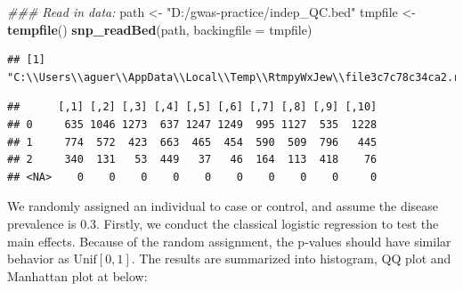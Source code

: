 \documentclass[
]{article}
\newenvironment{Shaded}{\begin{snugshade}}{\end{snugshade}}
\newcommand{\CommentTok}[1]{\textcolor[rgb]{0.56,0.35,0.01}{\textit{#1}}}
\newcommand{\DataTypeTok}[1]{\textcolor[rgb]{0.13,0.29,0.53}{#1}}
\newcommand{\DecValTok}[1]{\textcolor[rgb]{0.00,0.00,0.81}{#1}}
\newcommand{\KeywordTok}[1]{\textcolor[rgb]{0.13,0.29,0.53}{\textbf{#1}}}
\newcommand{\NormalTok}[1]{#1}
\newcommand{\OperatorTok}[1]{\textcolor[rgb]{0.81,0.36,0.00}{\textbf{#1}}}
\newcommand{\StringTok}[1]{\textcolor[rgb]{0.31,0.60,0.02}{#1}}
\begin{document}
\begin{Shaded}
\begin{Highlighting}[]
\CommentTok{### Read in data:}
\NormalTok{path <-}\StringTok{ "D:/gwas-practice/indep_QC.bed"}
\NormalTok{tmpfile  <-}\StringTok{ }\KeywordTok{tempfile}\NormalTok{()}
\KeywordTok{snp_readBed}\NormalTok{(path, }\DataTypeTok{backingfile =}\NormalTok{ tmpfile)}
\end{Highlighting}
\end{Shaded}

\begin{verbatim}
## [1] "C:\\Users\\aguer\\AppData\\Local\\Temp\\RtmpyWxJew\\file3c7c78c34ca2.rds"
\end{verbatim}

\begin{Shaded}
\end{Shaded}

\begin{verbatim}
##      [,1] [,2] [,3] [,4] [,5] [,6] [,7] [,8] [,9] [,10]
## 0     635 1046 1273  637 1247 1249  995 1127  535  1228
## 1     774  572  423  663  465  454  590  509  796   445
## 2     340  131   53  449   37   46  164  113  418    76
## <NA>    0    0    0    0    0    0    0    0    0     0
\end{verbatim}

We randomly assigned an individual to case or control, and assume the
disease prevalence is 0.3. Firstly, we conduct the classical logistic
regression to test the main effects. Because of the random assignment,
the p-values should have similar behavior as \(\text{Unif}[0,1]\). The
results are summarized into histogram, QQ plot and Manhattan plot at
below:
\end{document}
